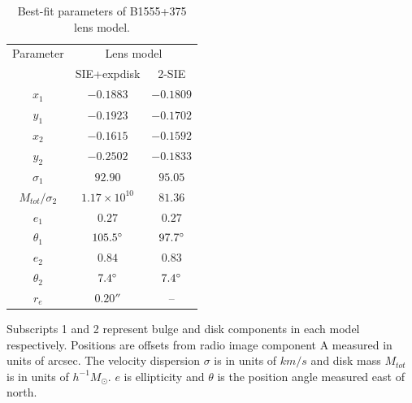 \documentclass[useAMS,usenatbib]{mn2e}
\begin{document}
\begin{table}
  \caption{Best-fit parameters of B1555+375 lens model.}
  \begin{tabular}{@{}ccc}
\hline 
 Parameter  & \multicolumn{2}{c}{Lens model} \\
		&SIE+expdisk& 2-SIE		   
\\
\hline
$x_1$  	& $-0.1883$	& $-0.1809$	  \\
$y_1$	&$-0.1923$	&$-0.1702$	  \\
$x_2$	&$-0.1615$ 	&$-0.1592$	  \\
$y_2$	&$-0.2502$	& $-0.1833$	  \\
$\sigma_1$	&$92.90$ &	$95.05$	  \\
$M_{tot} / \sigma_2$& $1.17\times 10^{10} $  &$81.36$ 	 \\  
$e_1$	& $0.27$	& $0.27$ \\  
$\theta_1$	&$105.5 \hbox{$^\circ$}$ & $97.7 \hbox{$^\circ$}$	 \\
$e_2$	&$0.84$	&$0.83$      \\
$\theta_2$	&$7.4\hbox{$^\circ$}$ &$7.4\hbox{$^\circ$}$  \\
$r_e$	& $0.20 ''$ &  -- \\
\hline
\end{tabular}

\medskip
Subscripts 1 and 2 represent bulge and disk components in each model respectively. Positions are offsets from radio image component A measured in units of arcsec. The velocity dispersion $\sigma$ is in units of $km/s$ and disk mass $M_{tot}$ is in units of $h^{-1} M_{\odot}$. $e$ is ellipticity and $\theta$ is the position angle measured east of north.

\end{table}
\end{document}
